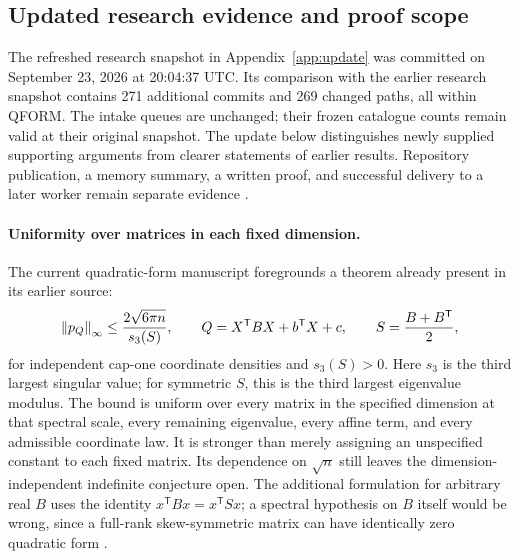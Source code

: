 \subsection{Updated research evidence and proof scope}
\label{sec:research-update}

The refreshed research snapshot in Appendix~\ref{app:update} was committed on September 23, 2026 at 20:04:37 UTC. Its comparison with the earlier research snapshot contains 271 additional commits and 269 changed paths, all within QFORM. The intake queues are unchanged; their frozen catalogue counts remain valid at their original snapshot. The update below distinguishes newly supplied supporting arguments from clearer statements of earlier results. Repository publication, a memory summary, a written proof, and successful delivery to a later worker remain separate evidence \citep{CaseQFORMCurrentMain2026,CaseQFORMUpdateCompare2026}.

\paragraph{Uniformity over matrices in each fixed dimension.}
The current quadratic-form manuscript foregrounds a theorem already present in its earlier source:
\begin{equation}
 \left\lVert p_Q\right\rVert_\infty\leq\frac{2\sqrt{6\pi n}}{s_3(S)},\qquad
 Q=X^{\mathsf T}BX+b^{\mathsf T}X+c,\qquad
 S=\frac{B+B^{\mathsf T}}2,
 \label{eq:qform-fixed-dimension-update}
\end{equation}
for independent cap-one coordinate densities and $s_3(S)>0$.
Here $s_3$ is the third largest singular value; for symmetric $S$, this is the third largest eigenvalue modulus.
The bound is uniform over every matrix in the specified dimension at that spectral scale, every remaining eigenvalue, every affine term, and every admissible coordinate law.
It is stronger than merely assigning an unspecified constant to each fixed matrix.
Its dependence on $\sqrt n$ still leaves the dimension-independent indefinite conjecture open.
The additional formulation for arbitrary real $B$ uses the identity $x^{\mathsf T}Bx=x^{\mathsf T}Sx$; a spectral hypothesis on $B$ itself would be wrong, since a full-rank skew-symmetric matrix can have identically zero quadratic form \citep{CaseQFORMCurrentMain2026,CaseQFORMCurrentStructure2026}.

